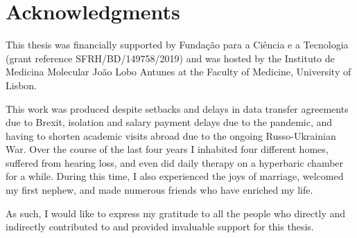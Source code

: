 \section*{Acknowledgments}



This thesis was financially supported by Fundação para a Ciência e a Tecnologia (grant reference SFRH/BD/149758/2019) and was hosted by the Instituto de Medicina Molecular João Lobo Antunes at the Faculty of Medicine, University of Lisbon.

\bsni
This work was produced despite setbacks and delays in data transfer agreements due to Brexit, isolation and salary payment delays due to the \covid pandemic, and having to shorten academic visits abroad due to the ongoing Russo-Ukrainian War.
Over the course of the last four years I inhabited four different homes, suffered from hearing loss, and even did daily therapy on a hyperbaric chamber for a while.
During this time, I also experienced the joys of marriage, welcomed my first nephew, and made numerous friends who have enriched my life.

As such, I would like to express my gratitude to all the people who directly and indirectly contributed to and provided invaluable support for this thesis.

